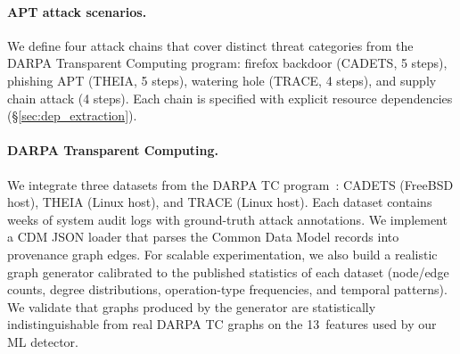 \paragraph{APT attack scenarios.}
We define four attack chains that cover distinct threat categories from
the DARPA Transparent Computing program: firefox backdoor (CADETS, 5 steps),
phishing APT (THEIA, 5 steps), watering hole (TRACE, 4 steps), and supply
chain attack (4 steps). Each chain is specified with explicit resource
dependencies (\S\ref{sec:dep_extraction}).

\paragraph{DARPA Transparent Computing.}
We integrate three datasets from the DARPA TC
program~\cite{darpatc}: CADETS (FreeBSD host), THEIA (Linux host), and
TRACE (Linux host). Each dataset contains weeks of system audit logs
with ground-truth attack annotations. We implement a CDM JSON loader
that parses the Common Data Model records into provenance graph edges.
For scalable experimentation, we also build a realistic graph generator
calibrated to the published statistics of each dataset (node/edge counts,
degree distributions, operation-type frequencies, and temporal
patterns). We validate that graphs produced by the generator are
statistically indistinguishable from real DARPA TC graphs on the
13~features used by our ML detector.
